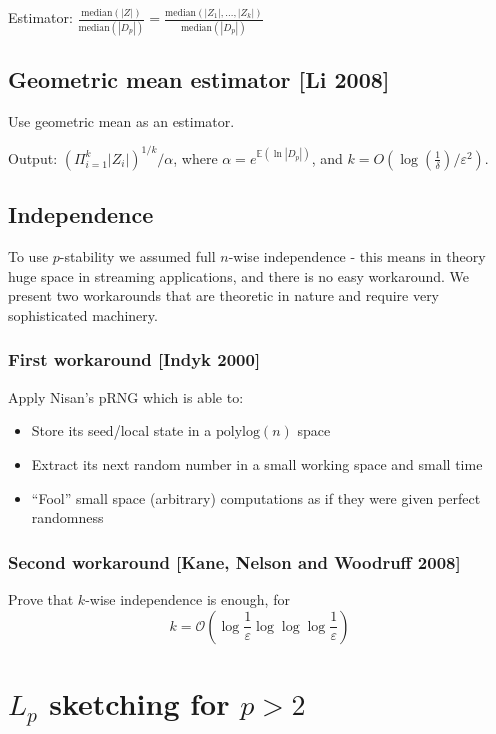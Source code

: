 \documentclass[11pt]{article}
\newcommand{\E}{{\mathbb E}}
\begin{document}
\medskip
\noindent
Estimator: $\frac{\textrm{median}(|Z|)}{\textrm{median}(|D_p|)} = \frac{\textrm{median}(|Z_1|,\ldots,|Z_k|)}{\textrm{median}(|D_p|)}$


\subsection{Geometric mean estimator [Li 2008]}
Use geometric mean as an estimator. 

Output: $(\Pi_{i=1}^k|Z_i|)^{1/k} / \alpha$, where
$\alpha = e^{\E(\ln |D_p| )}$, and $k = O(\log(\frac{1}{\delta}) / \varepsilon^2)$.

\subsection{Independence}
To use $p$-stability we assumed full $n$-wise independence - this means in theory huge space in streaming applications, and there is no easy workaround.  We present two workarounds that are theoretic in nature and require very sophisticated machinery.
\subsubsection{First workaround [Indyk 2000]}
Apply Nisan’s pRNG which is able to:
\begin{itemize}
\item Store its seed/local state in a $\textrm{polylog}(n)$ space
\item Extract its next random number in a small working space and small time
\item “Fool” small space (arbitrary) computations as if they were given perfect randomness
\end{itemize}

\subsubsection{Second workaround [Kane, Nelson and Woodruff 2008]}
Prove that $k$-wise independence is enough, for $$k = \mathcal{O}( \log \frac{1}{\varepsilon} \log\log\log \frac{1}{\varepsilon})$$

\section{$L_p$ sketching for $p > 2$}
\end{document}
